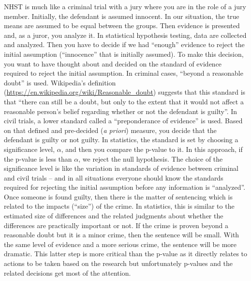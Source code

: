 \documentclass[
]{book}
\begin{document}
\indent NHST is much like a criminal trial with a jury where you are in the role
of a jury member. Initially, the defendant
is assumed innocent. In our situation, the true means are assumed to be
equal between the groups. Then evidence is presented and, as a juror,
you analyze it. In statistical hypothesis testing,
data are collected and
analyzed. Then you have to decide if we had ``enough'' evidence to reject
the initial assumption (``innocence'' that is initially assumed). To make
this decision, you want to have thought about and decided on the standard of
evidence required to reject the initial assumption. In criminal cases,
``beyond a reasonable doubt'' is used. Wikipedia's definition
(\url{https://en.wikipedia.org/wiki/Reasonable_doubt}) suggests that this
standard is that ``there can still be a doubt, but only to the extent
that it would not affect a reasonable person's belief regarding whether
or not the defendant is guilty''. In civil trials, a lower standard called
a ``preponderance of evidence'' is used. Based on that defined and pre-decided
(\emph{a priori}) measure, you decide that the defendant is guilty or not guilty.
In statistics, the standard is set by choosing a significance level, \(\alpha\), and then you compare the p-value
to it. In this approach, if the p-value is less than
\(\alpha\), we reject the null hypothesis. The choice of the significance level
is like the variation in standards of evidence between criminal and civil
trials -- and in all situations everyone should know the standards required
for rejecting the initial assumption before any information is ``analyzed''.
Once someone is found guilty, then there is the matter of sentencing which
is related to the impacts (``size'') of the crime. In statistics, this is
similar to the estimated size of differences and the related judgments
about whether the differences are practically important or not. If the
crime is proven beyond a reasonable doubt but it is a minor crime, then
the sentence will be small. With the same level of evidence and a more
serious crime, the sentence will be more dramatic. This latter step is more critical than the p-value as it directly relates to actions to be taken based on the research but unfortunately p-values and the related decisions get most of the attention.
\end{document}
